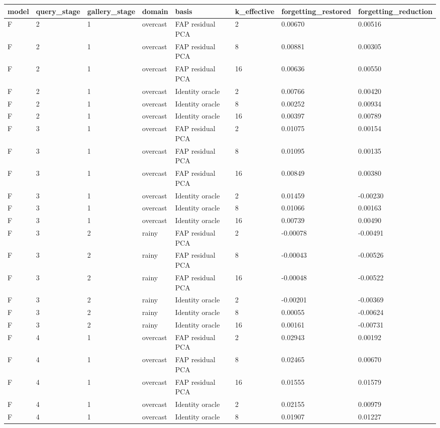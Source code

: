 \begin{tabular}{llllllll}
\toprule
model & query\_stage & gallery\_stage & domain & basis & k\_effective & forgetting\_restored & forgetting\_reduction \\
\midrule
F & 2 & 1 & overcast & FAP residual PCA & 2 & 0.00670 & 0.00516 \\
F & 2 & 1 & overcast & FAP residual PCA & 8 & 0.00881 & 0.00305 \\
F & 2 & 1 & overcast & FAP residual PCA & 16 & 0.00636 & 0.00550 \\
F & 2 & 1 & overcast & Identity oracle & 2 & 0.00766 & 0.00420 \\
F & 2 & 1 & overcast & Identity oracle & 8 & 0.00252 & 0.00934 \\
F & 2 & 1 & overcast & Identity oracle & 16 & 0.00397 & 0.00789 \\
F & 3 & 1 & overcast & FAP residual PCA & 2 & 0.01075 & 0.00154 \\
F & 3 & 1 & overcast & FAP residual PCA & 8 & 0.01095 & 0.00135 \\
F & 3 & 1 & overcast & FAP residual PCA & 16 & 0.00849 & 0.00380 \\
F & 3 & 1 & overcast & Identity oracle & 2 & 0.01459 & -0.00230 \\
F & 3 & 1 & overcast & Identity oracle & 8 & 0.01066 & 0.00163 \\
F & 3 & 1 & overcast & Identity oracle & 16 & 0.00739 & 0.00490 \\
F & 3 & 2 & rainy & FAP residual PCA & 2 & -0.00078 & -0.00491 \\
F & 3 & 2 & rainy & FAP residual PCA & 8 & -0.00043 & -0.00526 \\
F & 3 & 2 & rainy & FAP residual PCA & 16 & -0.00048 & -0.00522 \\
F & 3 & 2 & rainy & Identity oracle & 2 & -0.00201 & -0.00369 \\
F & 3 & 2 & rainy & Identity oracle & 8 & 0.00055 & -0.00624 \\
F & 3 & 2 & rainy & Identity oracle & 16 & 0.00161 & -0.00731 \\
F & 4 & 1 & overcast & FAP residual PCA & 2 & 0.02943 & 0.00192 \\
F & 4 & 1 & overcast & FAP residual PCA & 8 & 0.02465 & 0.00670 \\
F & 4 & 1 & overcast & FAP residual PCA & 16 & 0.01555 & 0.01579 \\
F & 4 & 1 & overcast & Identity oracle & 2 & 0.02155 & 0.00979 \\
F & 4 & 1 & overcast & Identity oracle & 8 & 0.01907 & 0.01227 \\

\end{tabular}
